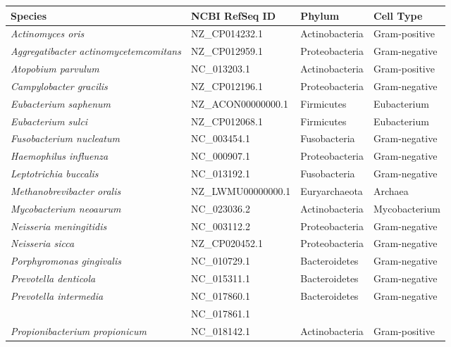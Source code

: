 \documentclass[12pt, a4paper]{article}
\renewcommand{\arraystretch}{1.2}
\newcommand{\ra}[1]{\renewcommand{\arraystretch}{#1}}
\begin{document}
{\begin{appendices}
\begin{table}[!ht]
\centering\footnotesize
\ra{1.3}
\setlength{\tabcolsep}{6pt}
\begin{tabular}{C{5cm} C{3.75cm} C{2.75cm} C{2.75cm} }
  \toprule
 	\textbf{Species} & \textbf{NCBI RefSeq ID} & \textbf{Phylum} & \textbf{Cell Type} \\ 
  \midrule
	\textit{Actinomyces oris} & NZ\_CP014232.1 & Actinobacteria & Gram-positive \\ 
  	\textit{Aggregatibacter actinomycetemcomitans }& NZ\_CP012959.1 & Proteobacteria & Gram-negative \\ 
  	\textit{Atopobium parvulum} & NC\_013203.1 & Actinobacteria & Gram-positive \\ 
  	\textit{Campylobacter gracilis} & NZ\_CP012196.1 & Proteobacteria & Gram-negative \\ 
  	\textit{Eubacterium saphenum} & NZ\_ACON00000000.1 & Firmicutes & Eubacterium \\ 
  	\textit{Eubacterium sulci} & NZ\_CP012068.1 & Firmicutes & Eubacterium \\ 
  	\textit{Fusobacterium nucleatum} & NC\_003454.1 & Fusobacteria & Gram-negative \\ 
  	\textit{Haemophilus influenza} & NC\_000907.1 & Proteobacteria & Gram-negative \\ 
  	\textit{Leptotrichia buccalis} & NC\_013192.1 & Fusobacteria & Gram-negative \\ 
  	\textit{Methanobrevibacter oralis} & NZ\_LWMU00000000.1 & Euryarchaeota & Archaea \\ 
  	\textit{Mycobacterium neoaurum} & NC\_023036.2 & Actinobacteria & Mycobacterium \\ 
  	\textit{Neisseria meningitidis} & NC\_003112.2 & Proteobacteria & Gram-negative \\ 
  	\textit{Neisseria sicca} & NZ\_CP020452.1 & Proteobacteria & Gram-negative \\ 
  	\textit{Porphyromonas gingivalis} & NC\_010729.1 & Bacteroidetes & Gram-negative \\ 
  	\textit{Prevotella denticola} & NC\_015311.1 & Bacteroidetes & Gram-negative \\ 
  	\textit{Prevotella intermedia} & NC\_017860.1 & Bacteroidetes & Gram-negative \\
  	 & NC\_017861.1 & & \\
  	\textit{Propionibacterium propionicum} & NC\_018142.1 & Actinobacteria & Gram-positive \\ 

\end{tabular}
\end{table}
\end{appendices}}
\end{document}
